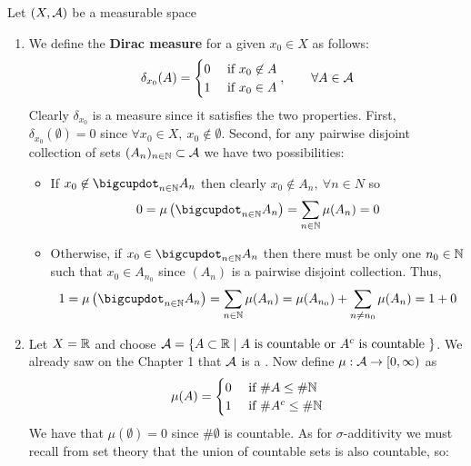 \newcommand{\tif}{&\text{ if }}
\begin{eg}
	Let $(X, \mathcal{A})$ be a measurable space
	\begin{enumerate}
		\item We define the \textbf{Dirac measure} for a given $x_0 \in X$ as follows:
		\begin{align*}
			\delta_{x_0}(A) = \begin{cases}
			0 \tif x_0\not\in A \\
			1 \tif x_0 \in A
			\end{cases},\qquad \forall A \in \sa
		\end{align*}
		Clearly $\delta_{x_0}$ is a measure since it satisfies the two properties. First, $\delta_{x_0}(\emptyset) = 0$ since $\forall x_0 \in X,\ x_0 \not\in \emptyset$. Second, for any pairwise disjoint collection of sets $(A_n)_{n\in\mathbb{N}} \subset \mathcal{A}$ we have two possibilities:
		\begin{itemize}
			\item If $x_0 \not\in \bigcupdot_{n \in \N} A_n$ then clearly $x_0 \not\in A_n,\ \forall n \in N$ so
			\begin{align*}
				0 = \mu\left(\bigcupdot_{n \in \N} A_n\right) = \sum_{n\in \N} \mu(A_n) = 0
			\end{align*}
			\item Otherwise, if $x_0 \in \bigcupdot_{n \in \N} A_n$ then there must be only one $n_0 \in \mathbb{N}$ such that $x_0 \in A_{n_0}$ since $(A_n)$ is a pairwise disjoint collection. Thus,
			\begin{align*}
				1 = \mu\left(\bigcupdot_{n \in \N} A_n\right) = \sum_{n\in \N} \mu(A_n) = \mu(A_{n_0}) + \sum_{n \neq n_0} \mu(A_n) = 1 + 0
			\end{align*}
		\end{itemize}
	\item Let $X = \mathbb{R}$ and choose $\mathcal{A} = \{A \subset \mathbb{R} \mid A\text{ is countable or } A^c \text{ is countable }\}$. We already saw on the Chapter 1 that $\mathcal{A}$ is a \siga. Now define $\mu:\mathcal{A} \to [0, \infty)$ as
	\begin{align*}
		\mu(A) = \begin{cases}
		0 \tif \# A \leq \# \N \\
		1 \tif \# A^\complement \leq \# \N
		\end{cases}
	\end{align*}
	We have that $\mu(\emptyset) = 0$ since $\#\emptyset$ is countable. As for $\sigma$-additivity we must recall from set theory that the union of countable sets is also countable, so:

\end{enumerate}
\end{eg}
